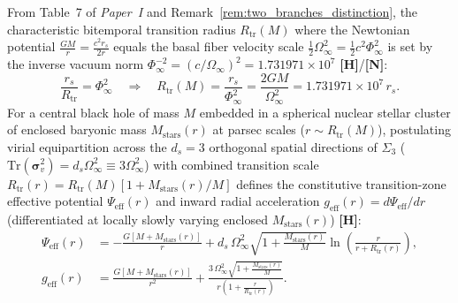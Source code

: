 \documentclass[11pt,a4paper]{article}
\newcommand{\catH}{\textbf{\textcolor{orange!85!black}{[H]}}}
\newcommand{\catN}{\textbf{\textcolor{teal!75!black}{[N]}}}
\theoremstyle{plain}
\theoremstyle{definition}
\theoremstyle{remark}
\numberwithin{equation}{section}
\begin{document}
From Table~7 of \textit{Paper~I} \cite{jimenez2026a} and Remark~\ref{rem:two_branches_distinction}, the characteristic bitemporal transition radius $R_{\text{tr}}(M)$ where the Newtonian potential $\frac{GM}{r} = \frac{c^2 r_s}{2r}$ equals the basal fiber velocity scale $\frac{1}{2}\Omega_{\infty}^2 = \frac{1}{2}c^2\Phi_{\infty}^2$ is set by the inverse vacuum norm $\Phi_{\infty}^{-2} = (c/\Omega_{\infty})^2 = 1.731971 \times 10^7$ \catH/\catN:
\begin{equation}
\frac{r_s}{R_{\text{tr}}} = \Phi_{\infty}^2 \quad \Longrightarrow \quad R_{\text{tr}}(M) = \frac{r_s}{\Phi_{\infty}^2} = \frac{2GM}{\Omega_{\infty}^2} = 1.731971 \times 10^7\,r_s.
\label{eq:universal_r_trunc_law}
\end{equation}
For a central black hole of mass $M$ embedded in a spherical nuclear stellar cluster of enclosed baryonic mass $M_{\text{stars}}(r)$ at parsec scales ($r \sim R_{\text{tr}}(M)$), postulating virial equipartition across the $d_s = 3$ orthogonal spatial directions of $\Sigma_3$ ($\text{Tr}(\boldsymbol{\sigma}_v^2) = d_s\Omega_{\infty}^2 \equiv 3\Omega_{\infty}^2$) with combined transition scale $R_{\text{tr}}(r) = R_{\text{tr}}(M)[1 + M_{\text{stars}}(r)/M]$ defines the constitutive transition-zone effective potential $\Psi_{\text{eff}}(r)$ and inward radial acceleration $g_{\text{eff}}(r) = d\Psi_{\text{eff}}/dr$ (differentiated at locally slowly varying enclosed $M_{\text{stars}}(r)$) \catH:
\begin{align}
\Psi_{\text{eff}}(r) &= -\frac{G\left[M + M_{\text{stars}}(r)\right]}{r} + d_s\,\Omega_{\infty}^2 \sqrt{1 + \frac{M_{\text{stars}}(r)}{M}} \ln\!\left(\frac{r}{r + R_{\text{tr}}(r)}\right), \label{eq:sgr_a_effective_potential} \\[5pt]
g_{\text{eff}}(r) &= \frac{G\left[M + M_{\text{stars}}(r)\right]}{r^2} + \frac{3\,\Omega_{\infty}^2 \sqrt{1 + \frac{M_{\text{stars}}(r)}{M}}}{r\left(1 + \frac{r}{R_{\text{tr}}(r)}\right)}.
\label{eq:sgr_a_effective_acceleration}
\end{align}
\end{document}
